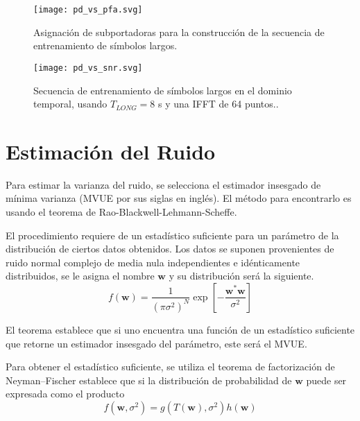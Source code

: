 \begin{figure}[t]
    \centering{}\texttt{[image: pd\_vs\_pfa.svg]}
    \caption{Asignación de subportadoras para la construcción de la secuencia de entrenamiento de símbolos largos.\label{fig:pdd-vs-pfa}}
\end{figure}
\begin{figure}[t]
    \centering{}\texttt{[image: pd\_vs\_snr.svg]}
    \caption{Secuencia de entrenamiento de símbolos largos en el dominio temporal, usando $T_{LONG} = 8$ \textmu s y una IFFT de 64 puntos..\label{fig:pd-vs-snr}}  
\end{figure}


%

\section{Estimación del Ruido}
\label{S:estimacion-ruido}

Para estimar la varianza del ruido, se selecciona el estimador insesgado de mínima varianza (MVUE por sus siglas en inglés). El método para encontrarlo es usando el teorema de Rao-Blackwell-Lehmann-Scheffe. \cite{kay}

El procedimiento requiere de un estadístico suficiente para un parámetro de la distribución de ciertos datos obtenidos. 
Los datos se suponen provenientes de ruido normal complejo de media nula independientes e idénticamente distribuidos, se le asigna el nombre $\mathbf{w}$ y su distribución será la siguiente. 
\begin{equation}\label{eq:noise-estimation-distribution}
    f(\mathbf{w}) = \frac{1}{\left(\pi\sigma^2\right)^N} \exp\left[- \frac{\mathbf{w}^\ast \mathbf{w}}{\sigma^2}\right]
\end{equation}

El teorema establece que si uno encuentra una función de un estadístico suficiente que retorne un estimador insesgado del parámetro, este será el MVUE. 

Para obtener el estadístico suficiente, se utiliza el teorema de factorización de Neyman--Fischer establece que si la distribución de probabilidad de $\mathbf{w}$ puede ser expresada como el producto
\begin{equation}
    f(\mathbf{w}, \sigma^2) = g(T(\mathbf{w}), \sigma^2)h(\mathbf{w})
\end{equation}

